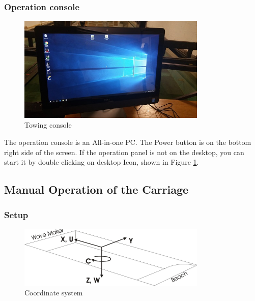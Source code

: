 \documentclass[a4paper,english]{report}
\begin{document}
\subsubsection*{Operation console}
\begin{figure}[htb!]
	\centering \includegraphics[width=0.8\textwidth]{fig/towing_console}
	\caption{Towing console}
	\label{fig: Towing console}
\end{figure}

The operation console is an All-in-one PC. The Power button is on the bottom right side of the screen. If the operation panel is not on the desktop, you can start it by double clicking on desktop Icon, shown in Figure \ref{fig: Towing console}.

\subsection{Manual Operation of the Carriage}
\subsubsection*{Setup}
\begin{figure}[htb!]
	\centering \includegraphics[width=0.8\textwidth]{fig/towing_coordinate_sketch}
	\caption{Coordinate system}
	\label{fig: Towing carriage-1}
\end{figure}
\end{document}
